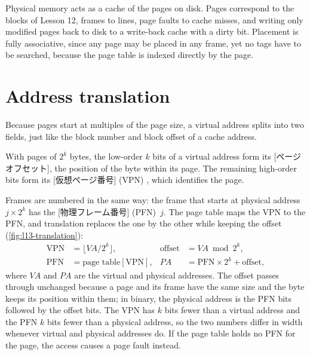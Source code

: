 \documentclass[../main.tex]{subfiles}
\begin{document}
\begin{note}
  Physical memory acts as a cache of the pages on disk.  Pages correspond to
  the blocks of Lesson 12, frames to lines, page faults to cache misses, and
  writing only modified pages back to disk to a write-back cache with a dirty
  bit.  Placement is fully associative, since any page may be placed in any
  frame, yet no tags have to be searched, because the page table is indexed
  directly by the page.
\end{note}

\section{Address translation}
\label{sec:l13-translation}

Because pages start at multiples of the page size, a virtual address splits
into two fields, just like the block number and block offset of a cache
address.

\begin{definition}
  With pages of $2^{k}$ bytes, the low-order $k$ bits of a virtual address form
  its [ページオフセット], the position of the byte within
  its page.  The remaining high-order bits form its
  [仮想ページ番号] (VPN)%
  , which identifies the page.
\end{definition}

Frames are numbered in the same way: the frame that starts at physical address
$j \times 2^{k}$ has the [物理フレーム番号]
(PFN)~$j$.  The page table maps the VPN
to the PFN, and translation replaces the one by the other while keeping the
offset (\cref{fig:l13-translation}):
\begin{equation}
  \begin{aligned}
    \text{VPN} &= \bigl\lfloor \mathit{VA} / 2^{k} \bigr\rfloor , &
    \text{offset} &= \mathit{VA} \bmod 2^{k} , \\
    \text{PFN} &= \text{page table}[\text{VPN}] , &
    \mathit{PA} &= \text{PFN} \times 2^{k} + \text{offset} ,
  \end{aligned}
  \label{eq:l13-translation}
\end{equation}
where $\mathit{VA}$ and $\mathit{PA}$ are the virtual and physical addresses.
The offset passes through unchanged because a page and its frame have the same
size and the byte keeps its position within them; in binary, the physical
address is the PFN bits followed by the offset bits.  The VPN has $k$ bits
fewer than a virtual address and the PFN $k$ bits fewer than a physical
address, so the two numbers differ in width whenever virtual and physical
addresses do.  If the page table holds no PFN for the page, the access causes a
page fault instead.
\end{document}
